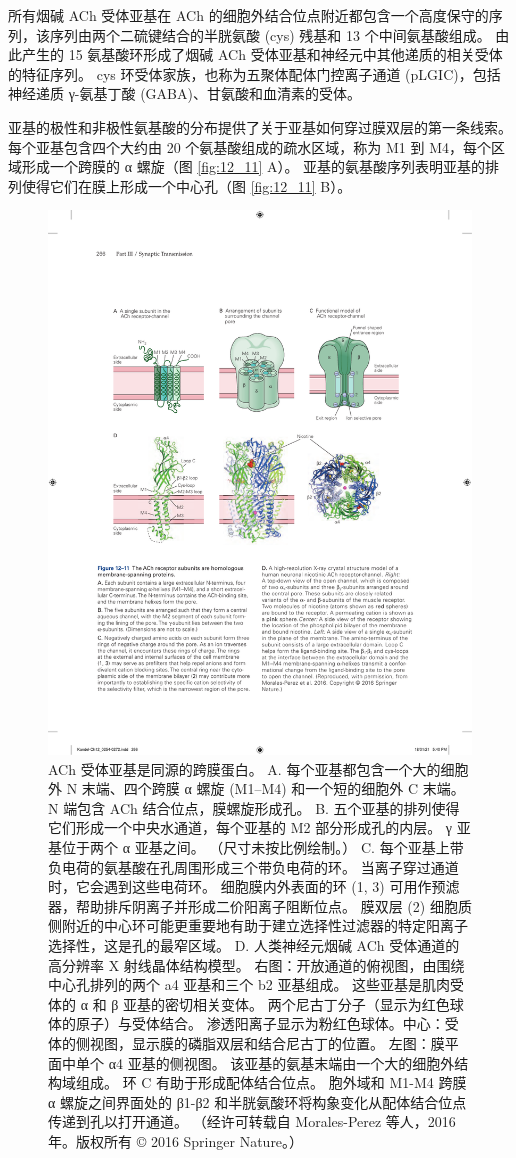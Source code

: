 所有烟碱 ACh 受体亚基在 ACh 的细胞外结合位点附近都包含一个高度保守的序列，该序列由两个二硫键结合的半胱氨酸 (cys) 残基和 13 个中间氨基酸组成。 
由此产生的 15 氨基酸环形成了烟碱 ACh 受体亚基和神经元中其他递质的相关受体的特征序列。 cys 环受体家族，也称为五聚体配体门控离子通道 (pLGIC)，包括神经递质 γ-氨基丁酸 (GABA)、甘氨酸和血清素的受体。


亚基的极性和非极性氨基酸的分布提供了关于亚基如何穿过膜双层的第一条线索。 
每个亚基包含四个大约由 20 个氨基酸组成的疏水区域，称为 M1 到 M4，每个区域形成一个跨膜的 α 螺旋（图 \ref{fig:12_11} A）。 亚基的氨基酸序列表明亚基的排列使得它们在膜上形成一个中心孔（图 \ref{fig:12_11} B）。

\begin{figure}[htbp]
	\centering
	\includegraphics[width=0.85\linewidth]{chap12/fig_12_11}
	\caption{ACh 受体亚基是同源的跨膜蛋白。 A. 每个亚基都包含一个大的细胞外 N 末端、四个跨膜 α 螺旋 (M1–M4) 和一个短的细胞外 C 末端。 N 端包含 ACh 结合位点，膜螺旋形成孔。 B. 五个亚基的排列使得它们形成一个中央水通道，每个亚基的 M2 部分形成孔的内层。 γ 亚基位于两个 α 亚基之间。 （尺寸未按比例绘制。） C. 每个亚基上带负电荷的氨基酸在孔周围形成三个带负电荷的环。 当离子穿过通道时，它会遇到这些电荷环。 细胞膜内外表面的环 (1, 3) 可用作预滤器，帮助排斥阴离子并形成二价阳离子阻断位点。 膜双层 (2) 细胞质侧附近的中心环可能更重要地有助于建立选择性过滤器的特定阳离子选择性，这是孔的最窄区域。 D. 人类神经元烟碱 ACh 受体通道的高分辨率 X 射线晶体结构模型。 右图：开放通道的俯视图，由围绕中心孔排列的两个 a4 亚基和三个 b2 亚基组成。 这些亚基是肌肉受体的 α 和 β 亚基的密切相关变体。 两个尼古丁分子（显示为红色球体的原子）与受体结合。 渗透阳离子显示为粉红色球体。中心：受体的侧视图，显示膜的磷脂双层和结合尼古丁的位置。 左图：膜平面中单个 α4 亚基的侧视图。 该亚基的氨基末端由一个大的细胞外结构域组成。 环 C 有助于形成配体结合位点。 胞外域和 M1-M4 跨膜 α 螺旋之间界面处的 β1-β2 和半胱氨酸环将构象变化从配体结合位点传递到孔以打开通道。 （经许可转载自 Morales-Perez 等人，2016 年。版权所有 © 2016 Springer Nature。）}

\end{figure}
